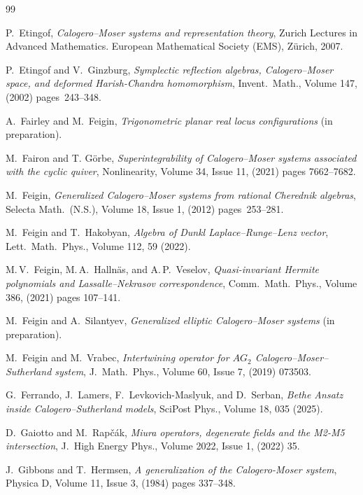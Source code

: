 \documentclass[12pt]{amsart}
\numberwithin{equation}{section}
\theoremstyle{definition}
\begin{document}
\begin{small}
\begin{thebibliography}{99}
{
P.\ Etingof, \textit{Calogero--Moser systems and representation theory},  Zurich Lectures in Advanced Mathematics. European Mathematical Society (EMS), Z\"urich, 2007.


P.\ Etingof and V.\ Ginzburg, \textit{Symplectic reflection algebras, Calogero--Moser space, and deformed Harish-Chandra homomorphism}, Invent.\ Math., Volume 147, (2002) pages~243--348. 

A.\ Fairley and M.\ Feigin, \textit{Trigonometric planar real locus configurations} (in preparation).

M.\  Fairon and T. G\"orbe, \textit{Superintegrability of Calogero--Moser systems associated with the cyclic quiver}, Nonlinearity, Volume 34, Issue 11, (2021) pages 7662--7682. 


M.\ Feigin, \textit{Generalized Calogero--Moser systems from rational Cherednik algebras},  Selecta Math.\ (N.S.), Volume 18, Issue 1, (2012) pages~253--281.

M.\ Feigin and T.\ Hakobyan, 
\textit{Algebra of Dunkl Laplace–Runge–Lenz vector}, Lett.\ Math.\ Phys., Volume 112, 59 (2022).

M.\,V.\ Feigin, M.\,A.\ Hallnäs, and A.\,P.\ Veselov, \textit{Quasi-invariant Hermite polynomials and Lassalle--Nekrasov correspondence}, Comm.\ Math.\ Phys., Volume 386, (2021) pages 107--141. 

M.\ Feigin and A.\ Silantyev, \textit{Generalized elliptic Calogero--Moser systems} (in preparation).

M.\ Feigin and M.\ Vrabec, \textit{Intertwining operator for $AG_2$ Calogero--Moser--Sutherland system}, J.\ Math.\ Phys., Volume 60, Issue 7, (2019) 073503.

G.\ Ferrando, J.\ Lamers, F.\ Levkovich-Maslyuk, and D.\ Serban, \textit{Bethe Ansatz inside Calogero--Sutherland models}, SciPost Phys., Volume 18, 035 (2025).

D.\ Gaiotto and M.\ Rapčák, \textit{Miura operators, degenerate fields and the M2-M5 intersection},  J.\ High Energy Phys., Volume 2022, Issue 1, (2022) 35.

J.\ Gibbons and T.\ Hermsen, \textit{A generalization of the Calogero-Moser system}, Physica D, Volume 11, Issue 3, (1984) pages 337--348.

}
\end{thebibliography}
\end{small}
\end{document}
